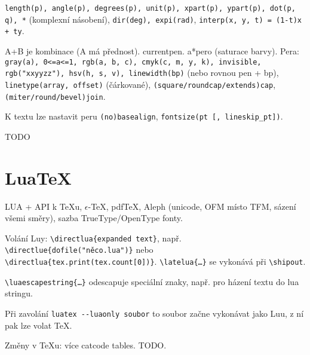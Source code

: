 \documentclass[12pt]{article}					%
\begin{document}
    \begin{definice}
            \verb|length(p), angle(p), degrees(p), unit(p), xpart(p), ypart(p), dot(p, q), *| (komplexní násobení), \verb|dir(deg), expi(rad)|, \verb|interp(x, y, t) = (1-t)x + ty|.
    \end{definice}

    \begin{definice}[Pera]
        A+B je kombinace (A má přednost). currentpen. a*pero (saturace barvy). Pera: \verb|gray(a), 0<=a<=1, rgb(a, b, c), cmyk(c, m, y, k), invisible, rgb("xxyyzz"), hsv(h, s, v), linewidth(bp)| (nebo rovnou pen + bp), \verb|linetype(array, offset)| (čárkované), \verb|(square/roundcap/extends)cap|, \verb|(miter/round/bevel)join|.

        K textu lze nastavit peru \verb|(no)basealign|, \verb|fontsize(pt [, lineskip_pt])|.
    \end{definice}


    TODO

\section{LuaTeX}
    \begin{definice}
        LUA + API k TeXu, $\epsilon$-TeX, pdfTeX, Aleph (unicode, OFM místo TFM, sázení všemi směry), sazba TrueType/OpenType fonty.

        Volání Luy: \verb|\directlua{expanded text}|, např. \verb|\directlue{dofile("něco.lua")}| nebo \verb|\directlua{tex.print(tex.count[0])}|. \verb|\latelua{…}| se vykonává při \verb|\shipout|.

        \verb|\luaescapestring{…}| odescapuje speciální znaky, např. pro házení textu do lua stringu.
        
        Při zavolání \verb|luatex --luaonly soubor| to soubor začne vykonávat jako Luu, z ní pak lze volat TeX.

        Změny v TeXu: více catcode tables. TODO. 
    \end{definice}
\end{document}
